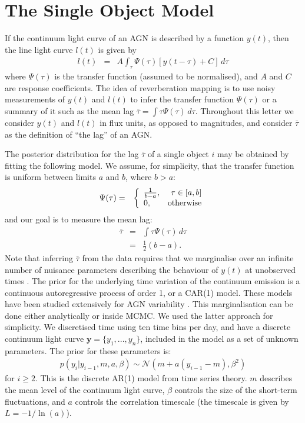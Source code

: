 \documentclass[useAMS,usenatbib]{mn2e}
\begin{document}
\section{The Single Object Model}\label{sec:single_object}
If the continuum light curve of an AGN
is described by a function $y(t)$, then the line
light curve $l(t)$ is given by
\begin{eqnarray}
l(t) &=& A \int_\tau \Psi(\tau)\left[y(t - \tau) + C\right] \, d\tau
\end{eqnarray}
where $\Psi(\tau)$ is the transfer function (assumed to be normalised),
and $A$ and $C$ are response
coefficients. The idea of reverberation mapping is to use noisy measurements
of $y(t)$ and $l(t)$ to infer the transfer function $\Psi(\tau)$ or a summary
of it such as the mean lag $\bar{\tau} = \int \tau\Psi(\tau) \, d\tau$.
Throughout this letter we consider $y(t)$ and $l(t)$ in flux
units, as opposed to magnitudes, and consider $\bar{\tau}$ as
the definition of ``the lag'' of an AGN.

The posterior distribution for the lag $\bar{\tau}$ of a single object
$i$ may be obtained
by fitting the following model. We assume, for simplicity, that
the transfer function is uniform
between limits $a$ and $b$, where $b > a$:
\begin{eqnarray}
\Psi(\tau) &=& \left\{
\begin{array}{lr}
\frac{1}{b-a}, & \tau \in [a,b]\\
0, & \textnormal{otherwise}
\end{array}\right.
\end{eqnarray}
and our goal is to measure the mean lag:
\begin{eqnarray}
\bar{\tau} &=& \int \tau \Psi(\tau) \, d\tau\\
&=& \frac{1}{2}(b-a).
\end{eqnarray}
Note that inferring $\bar{\tau}$ from the data requires that we
marginalise over an infinite number of nuisance parameters describing the
behaviour of $y(t)$ at unobserved times \citep{pancoast}.
The prior for the underlying time variation of the continuum emission is
a continuous autoregressive process of order 1, or a CAR(1) model. These models
have been studied extensively for AGN variability
\citep[e.g.][]{2009ApJ...698..895K, 2011ApJ...735...80Z, 2013ApJ...765..106Z}.
This marginalisation can be done
either analytically or inside MCMC. We used the latter approach for simplicity.
We discretised
time using ten time bins per day, and have a discrete continuum light curve
$\mathbf{y} = \{y_1, ..., y_n\}$, included in the model as a set of unknown
parameters. The prior for these parameters is:
\begin{eqnarray}
p(y_i | y_{i-1},  m, a, \beta) \sim \mathcal{N}
\left(m + a\left(y_{i-1} - m\right), \beta^2\right)
\end{eqnarray}
for $i \geq 2$. This is the discrete AR(1) model from time series theory.
$m$ describes the mean level of the continuum light curve, $\beta$ controls
the size of the short-term fluctuations, and $a$ controls the correlation
timescale (the timescale is given by $L = -1/\ln(a)$).
\end{document}
